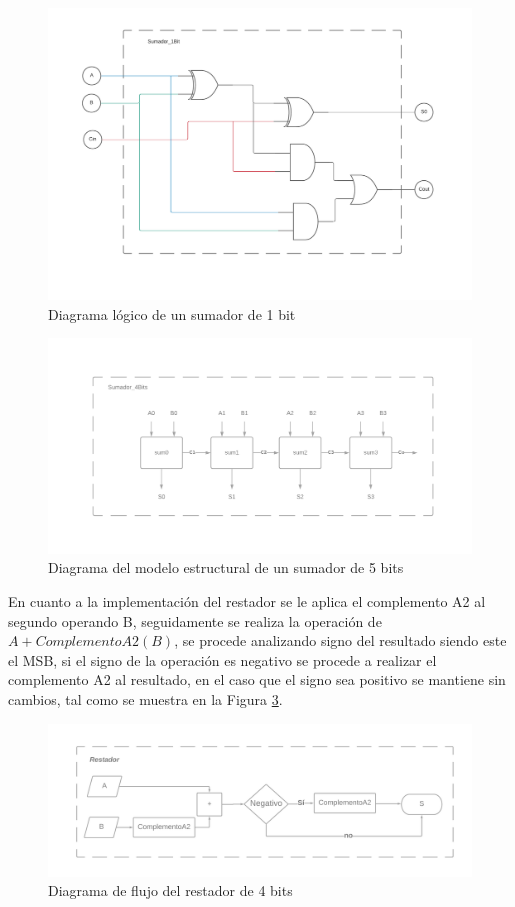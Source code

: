 \documentclass[journal]{IEEEtran}
\begin{document}
	\begin{figure}[hbtp]
		\centering
		\includegraphics[scale = 0.13]{img/Sumador1.png}
		\caption{Diagrama lógico de un sumador de 1 bit }
		\label{fig:sum1}
	\end{figure}
	
	
	\begin{figure}[hbtp]
		\centering
		\includegraphics[scale = 0.15]{img/sumador4.png}
		\caption{Diagrama del modelo estructural de un sumador de 5 bits }
		\label{fig:sum4}
	\end{figure}
	
	
	En cuanto a la implementación del restador se le aplica el complemento A2 al segundo operando B, seguidamente se realiza la operación de $A+ComplementoA2(B)$, se procede analizando signo del resultado siendo este el MSB, si el signo de la operación es negativo se procede a realizar el complemento A2 al resultado, en el caso que el signo sea positivo se mantiene sin cambios, tal como se muestra en la Figura \ref{fig:rest4}.
	
	\begin{figure}[hbtp]
		\centering
		\includegraphics[scale = 0.07
		]{img/rest.png}
		\caption{Diagrama de flujo del restador de 4 bits }
		\label{fig:rest4}
	\end{figure}
	
\end{document}

